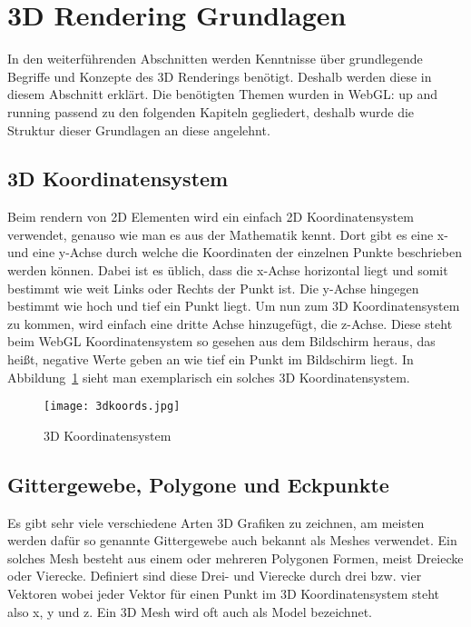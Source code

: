 \section{3D Rendering Grundlagen}
In den weiterführenden Abschnitten werden Kenntnisse über grundlegende Begriffe und Konzepte des 3D Renderings benötigt.
Deshalb werden diese in diesem Abschnitt erklärt.
Die benötigten Themen wurden in WebGL: up and running \cite[4-9]{parisi2012webgl} passend zu den folgenden Kapiteln gegliedert, deshalb wurde die Struktur dieser Grundlagen an diese angelehnt.

\subsection{3D Koordinatensystem}
Beim rendern von 2D Elementen wird ein einfach 2D Koordinatensystem verwendet, genauso wie man es aus der Mathematik kennt. Dort gibt es eine x- und eine y-Achse durch welche die Koordinaten der einzelnen Punkte beschrieben werden können.
Dabei ist es üblich, dass die x-Achse horizontal liegt und somit bestimmt wie weit Links oder Rechts der Punkt ist. Die y-Achse hingegen bestimmt wie hoch und tief ein Punkt liegt.
Um nun zum 3D Koordinatensystem zu kommen, wird einfach eine dritte Achse hinzugefügt, die z-Achse. Diese steht beim WebGL Koordinatensystem so gesehen aus dem Bildschirm heraus, das heißt,
 negative Werte geben an wie tief ein Punkt im Bildschirm liegt.\cite[4]{parisi2012webgl} In Abbildung~\ref{fig:3DKoordinatensystem} sieht man exemplarisch ein solches 3D Koordinatensystem.
 \begin{figure}
    \centering
    \texttt{[image: 3dkoords.jpg]}
    \caption{3D Koordinatensystem \cite{PeterStrohm}} \label{fig:3DKoordinatensystem}
    \end{figure}

\subsection{Gittergewebe, Polygone und Eckpunkte}
Es gibt sehr viele verschiedene Arten 3D Grafiken zu zeichnen, am meisten werden dafür so genannte Gittergewebe auch bekannt als Meshes verwendet.
Ein solches Mesh besteht aus einem oder mehreren Polygonen Formen, meist Dreiecke oder Vierecke. Definiert sind diese Drei- und Vierecke durch drei bzw.
vier Vektoren wobei jeder Vektor für einen Punkt im 3D Koordinatensystem steht also x, y und z.
Ein 3D Mesh wird oft auch als Model bezeichnet. \cite[4]{parisi2012webgl}

